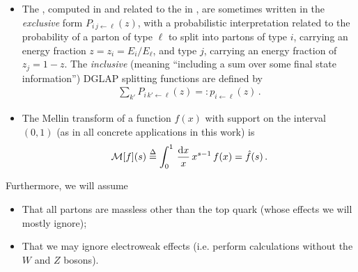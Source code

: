 \begin{itemize}
    \item
        The , computed in  and related to the  in , are sometimes written in the \emph{exclusive} form \(P_{i\,j \leftarrow \ell}(z)\), with a probabilistic interpretation related to the probability of a parton of type \(\ell\) to split into partons of type \(i\), carrying an energy fraction \(z = z_i = E_i / E_\ell\), and type \(j\), carrying an energy fraction of \(z_j = 1-z\).
        The \emph{inclusive} (meaning ``including a sum over some final state information'') DGLAP splitting functions are defined by
        \begin{align}
            \sum_{k'} P_{i\,k' \leftarrow \ell}(z) =: p_{i\leftarrow \ell}(z)
            \,.
        \end{align}


    \item
        The Mellin transform of a function \(f(x)\) with support on the interval \((0,1)\) (as in all concrete applications in this work) is
        \begin{align}
            \mathcal{M}[f](s)
            \overset{\Delta}{=}
            \int_0^1 \,\frac{\dd x}{x}\, x^{s-1} \, f(x)
            =
            \hat f(s)
            \,.
        \end{align}

\end{itemize}


Furthermore, we will assume
\begin{itemize}
    \item
    That all partons are massless other than the top quark (whose effects we will mostly ignore);

    \item
    That we may ignore electroweak effects (i.e. perform calculations without the \(W\) and \(Z\) bosons).
\end{itemize}
